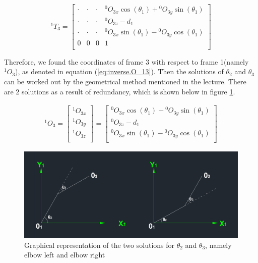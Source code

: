 \documentclass{article}
\renewcommand{\c}[1]{\cos(\theta_{#1})}
\newcommand{\s}[1]{\sin(\theta_{#1})}
\newcommand{\T}[2]{{}^{#1}T_{#2}}
\renewcommand{\O}[2]{{}^{#1}O_{#2}}
\begin{document}
\begin{equation}
\label{eq:inverse.t_13_expanded}
\T{1}{3} = \left[ \begin{array}{cccc}
	\cdot & \cdot & \cdot & \O{0}{3x} \c{1} + \O{0}{3y} \s{1} \\
	\cdot & \cdot & \cdot & \O{0}{3z}-d_1 \\
	\cdot & \cdot & \cdot & \O{0}{3x} \s{1}-\O{0}{3y} \c{1} \\
	0 & 0 & 0 & 1 \\
\end{array} \right]
\end{equation}

Therefore, we found the coordinates of frame 3 with respect to frame 1(namely $\O{1}{3}$), as denoted in equation (\ref{eq:inverse.O_13}). Then the solutions of  $\theta_2$ and  $\theta_3$ can be worked out by the geometrical method mentioned in the lecture. There are 2 solutions as a result of redundancy, which is shown below in figure \ref{fig:theta_2,theta_3}.

\begin{align}
\label{eq:inverse.O_13}
\O{1}{3} = 
\left[ \begin{array}{c}
	\O{1}{3x} \\
	\O{1}{3y} \\
	\O{1}{3z} \\
\end{array} \right] = \left[ \begin{array}{c}
	\O{0}{3x} \c{1} + \O{0}{3y} \s{1} \\
	\O{0}{3z}-d_1 \\
	\O{0}{3x} \s{1}-\O{0}{3y} \c{1} \\
\end{array} \right]
\end{align}

\begin{figure}[htbp] 
\begin{center}
\includegraphics[width=\textwidth]{images/theta2,theta3}
\caption{Graphical representation of the two solutions for $\theta_2$ and $\theta_3$, namely elbow left and elbow right}
\label{fig:theta_2,theta_3}
\end{center}
\end{figure}
\end{document}
